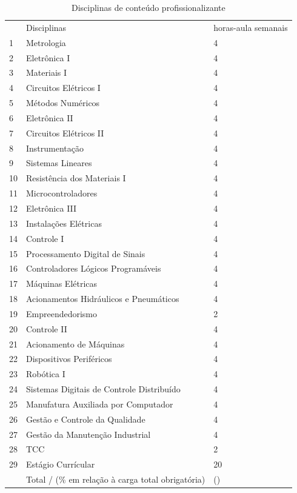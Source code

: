 \begin{longtable}{|p{0.8cm}|p{7.5cm}|p{2.0cm}|}
	\caption{Disciplinas de conteúdo profissionalizante}\label{tab6} 
	\vspace{-0.25cm}
	\\ \hline 
	\cellcolor{\cinza} & \cellcolor{\cinza}Disciplinas & \cellcolor{\cinza}horas-aula semanais  \\ 
	\hline
	1 &  Metrologia  &  4 \\ \hline
	2 &  Eletrônica I  &  4 \\ \hline
	3 &  Materiais I  &  4 \\ \hline
	4 &  Circuitos Elétricos I  &  4 \\ \hline
	5 &  Métodos Numéricos  &  4 \\ \hline
	6 &  Eletrônica II  &  4 \\ \hline
	7 &  Circuitos Elétricos II  &  4 \\ \hline
	8 &  Instrumentação  &  4 \\ \hline
	9 &  Sistemas Lineares  &  4 \\ \hline
	10 &  Resistência dos Materiais I  &  4 \\ \hline
	11 &  Microcontroladores  &  4 \\ \hline
	12 &  Eletrônica III  &  4 \\ \hline
	13 &  Instalações Elétricas  &  4 \\ \hline
	14 &  Controle I  &  4 \\ \hline
	15 &  Processamento Digital de Sinais  &  4 \\ \hline
	16 &  Controladores Lógicos Programáveis  &  4 \\ \hline
	17 &  Máquinas Elétricas  &  4 \\ \hline
	18 &  Acionamentos Hidráulicos e Pneumáticos  &  4 \\ \hline
	19 &  Empreendedorismo  &  2 \\ \hline
	20 &  Controle II  &  4 \\ \hline
	21 &  Acionamento de Máquinas  &  4 \\ \hline
	22 &  Dispositivos Periféricos  &  4 \\ \hline
	23 &  Robótica I  &  4 \\ \hline
	24 &  Sistemas Digitais de Controle Distribuído  &  4 \\ \hline
	25 &  Manufatura Auxiliada por Computador  &  4 \\ \hline
	26 &  Gestão e Controle da Qualidade  &  4 \\ \hline
	27 &  Gestão da Manutenção Industrial &  4 \\ \hline
	28 &  TCC  &  2 \\ \hline
	29 &  Estágio Currícular  &  20 \\ \hline
	&  Total / (\% em relação à carga total obrigatória)  &  \CHPROFCR(\CHPROFPEMIN) \\ \hline
\end{longtable}

